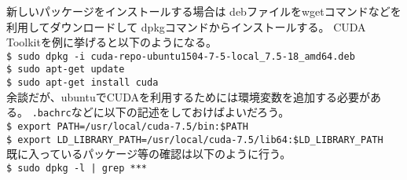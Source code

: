 新しいパッケージをインストールする場合は
debファイルをwgetコマンドなどを利用してダウンロードして
dpkgコマンドからインストールする。
CUDA Toolkitを例に挙げると以下のようになる。\\
\texttt{\$ sudo dpkg -i cuda-repo-ubuntu1504-7-5-local\_7.5-18\_amd64.deb}\\
\texttt{\$ sudo apt-get update}\\
\texttt{\$ sudo apt-get install cuda}\\
余談だが、ubuntuでCUDAを利用するためには環境変数を追加する必要がある。
\texttt{.bachrc}などに以下の記述をしておけばよいだろう。\\
\texttt{\$ export PATH=/usr/local/cuda-7.5/bin:\$PATH}\\
\texttt{\$ export LD\_LIBRARY\_PATH=/usr/local/cuda-7.5/lib64:\$LD\_LIBRARY\_PATH}\\
既に入っているパッケージ等の確認は以下のように行う。\\
\texttt{\$ sudo dpkg -l | grep ***}




























